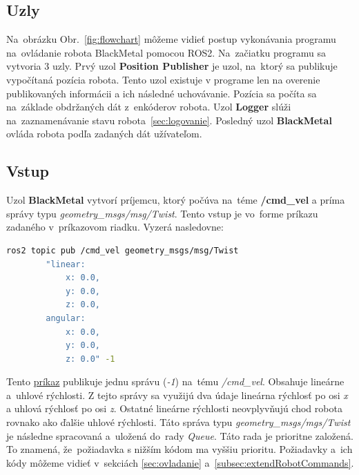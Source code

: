 \subsection{Uzly}
\label{subsec:nodes}

Na~obrázku Obr.~\ref{fig:flowchart} môžeme vidieť postup vykonávania programu na~ovládanie
robota BlackMetal pomocou ROS2. Na~začiatku programu sa vytvoria 3 uzly. Prvý uzol
\textbf{Position Publisher} je uzol, na~ktorý sa publikuje vypočítaná pozícia robota.
Tento uzol existuje v programe len na overenie publikovaných informácii a ich následné uchovávanie.
Pozícia sa počíta sa na~základe obdržaných dát z~enkóderov robota. Uzol \textbf{Logger} slúži na~zaznamenávanie
stavu robota~\ref{sec:logovanie}. Posledný uzol \textbf{BlackMetal} ovláda robota podľa 
zadaných dát užívateľom.

\subsection{Vstup}
\label{subsec:input}

Uzol \textbf{BlackMetal} vytvorí príjemcu, ktorý počúva na~téme \textbf{/cmd\_vel} a príma správy typu
\textit{geometry\_msgs/msg/Twist}. Tento vstup je vo~forme príkazu zadaného v~príkazovom riadku. Vyzerá nasledovne:


\label{requestCommand}
\begin{lstlisting}[language=bash]
	ros2 topic pub /cmd_vel geometry_msgs/msg/Twist
		"linear:
			x: 0.0,
			y: 0.0,
			z: 0.0,
		angular:
			x: 0.0,
			y: 0.0,
			z: 0.0" -1
\end{lstlisting}

Tento \hyperref[requestCommand]{príkaz} publikuje jednu správu (\textit{-1}) na~tému \textit{/cmd\_vel}.
Obsahuje lineárne a~uhlové rýchlosti. Z tejto správy sa využijú dva údaje lineárna rýchlosť
po osi \textit{x} a uhlová rýchlosť po osi \textit{z}. Ostatné lineárne rýchlosti neovplyvňujú
chod robota rovnako ako ďalšie uhlové rýchlosti. Táto správa typu \textit{geometry\_msgs/mgs/Twist}
je následne spracovaná a~uložená do~rady \textit{Queue}. Táto rada je prioritne založená.
To znamená, že~požiadavka s nižším kódom ma vyššiu prioritu. Požiadavky a~ich kódy môžeme vidieť v~sekciách \ref{sec:ovladanie} a~\ref{subsec:extendRobotCommands}.

